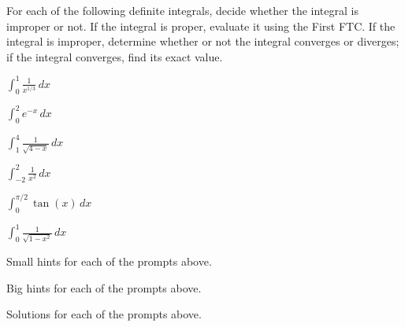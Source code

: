 \begin{activity} \label{A:6.5.2}  For each of the following definite integrals, decide whether the integral is improper or not.  If the integral is proper, evaluate it using the First FTC.  If the integral is improper, determine whether or not the integral converges or diverges; if the integral converges, find its exact value. 
\ba
	\item $\int_0^1 \frac{1}{x^{1/3}} \, dx$
	\item $\int_0^2 e^{-x} \, dx$
	\item $\int_1^4 \frac{1}{\sqrt{4-x}} \, dx$
	\item $\int_{-2}^2 \frac{1}{x^2} \, dx$
	\item $\int_0^{\pi/2} \tan(x) \, dx$
	\item $\int_0^1 \frac{1}{\sqrt{1-x^2}} \, dx$
\ea

\end{activity}
\begin{smallhint}
\ba
	\item Small hints for each of the prompts above.
\ea
\end{smallhint}
\begin{bighint}
\ba
	\item Big hints for each of the prompts above.
\ea
\end{bighint}
\begin{activitySolution}
\ba
	\item Solutions for each of the prompts above.
\ea
\end{activitySolution}
\aftera